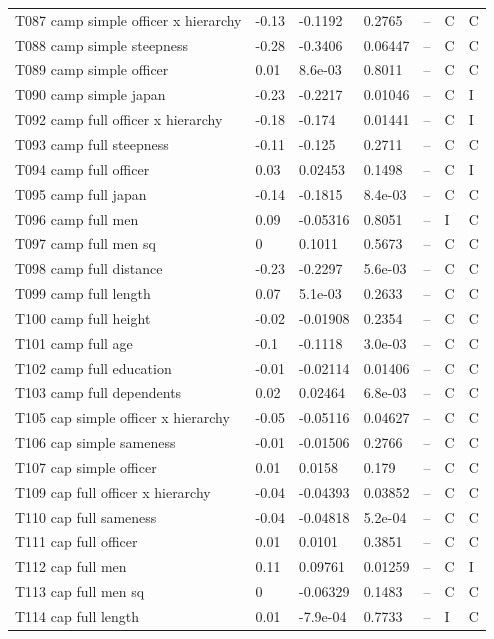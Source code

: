 {\begin{longtable}{@{}p{.245\linewidth}p{.17\linewidth}p{.17\linewidth}p{.085\linewidth}p{.060\linewidth}p{.08\linewidth}p{.07\linewidth}@{}}
T087 camp simple officer x hierarchy & -0.13 & -0.1192 & 0.2765 & -- & C & C\\
T088 camp simple steepness & -0.28 & -0.3406 & 0.06447 & -- & C & C\\
T089 camp simple officer & 0.01 & 8.6e-03 & 0.8011 & -- & C & C\\
T090 camp simple japan & -0.23 & -0.2217 & 0.01046 & -- & C & I\\
T092 camp full officer x hierarchy & -0.18 & -0.174 & 0.01441 & -- & C & I\\
T093 camp full steepness & -0.11 & -0.125 & 0.2711 & -- & C & C\\
T094 camp full officer & 0.03 & 0.02453 & 0.1498 & -- & C & I\\
T095 camp full japan & -0.14 & -0.1815 & 8.4e-03 & -- & C & C\\
T096 camp full men & 0.09 & -0.05316 & 0.8051 & -- & I & C\\
T097 camp full men sq & 0 & 0.1011 & 0.5673 & -- & C & C\\
T098 camp full distance & -0.23 & -0.2297 & 5.6e-03 & -- & C & C\\
T099 camp full length & 0.07 & 5.1e-03 & 0.2633 & -- & C & C\\
T100 camp full height & -0.02 & -0.01908 & 0.2354 & -- & C & C\\
T101 camp full age & -0.1 & -0.1118 & 3.0e-03 & -- & C & C\\
T102 camp full education & -0.01 & -0.02114 & 0.01406 & -- & C & C\\
T103 camp full dependents & 0.02 & 0.02464 & 6.8e-03 & -- & C & C\\
T105 cap simple officer x hierarchy & -0.05 & -0.05116 & 0.04627 & -- & C & C\\
T106 cap simple sameness & -0.01 & -0.01506 & 0.2766 & -- & C & C\\
T107 cap simple officer & 0.01 & 0.0158 & 0.179 & -- & C & C\\
T109 cap full officer x hierarchy & -0.04 & -0.04393 & 0.03852 & -- & C & C\\
T110 cap full sameness & -0.04 & -0.04818 & 5.2e-04 & -- & C & C\\
T111 cap full officer & 0.01 & 0.0101 & 0.3851 & -- & C & C\\
T112 cap full men & 0.11 & 0.09761 & 0.01259 & -- & C & I\\
T113 cap full men sq & 0 & -0.06329 & 0.1483 & -- & C & C\\
T114 cap full length & 0.01 & -7.9e-04 & 0.7733 & -- & I & C\\

\end{longtable}}
